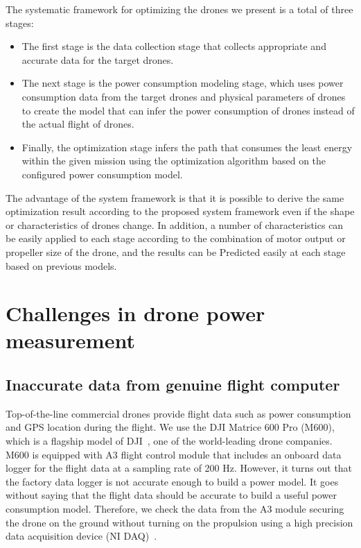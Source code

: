 \documentclass[journal]{./template/IEEEtran}
\begin{document}
The systematic framework for optimizing the drones we present is a total of three stages: 
\begin{itemize}
    \item The first stage is the data collection stage that collects appropriate and accurate data for the target drones.
    \item The next stage is the power consumption modeling stage, which uses power consumption data from the target drones and physical parameters of drones to create the model that can infer the power consumption of drones instead of the actual flight of drones.
    \item Finally, the optimization stage infers the path that consumes the least energy within the given mission using the optimization algorithm based on the configured power consumption model.
\end{itemize}

The advantage of the system framework is that it is possible to derive the same optimization result according to the proposed system framework even if the shape or characteristics of drones change.
In addition, a number of characteristics can be easily applied to each stage according to the combination of motor output or propeller size of the drone, and the results can be Predicted easily at each stage based on previous models.

\section{Challenges in drone power measurement}
\label{Section: Challenges in drone power measurement}
\subsection{Inaccurate data from genuine flight computer}
Top-of-the-line commercial drones provide flight data such as power consumption and GPS location during the flight. 
We use the DJI Matrice 600 Pro (M600), which is a flagship model of DJI~\cite{ref_11}, one of the world-leading drone companies. 
M600 is equipped with A3 flight control module that includes an onboard data logger for the flight data at a sampling rate of 200 Hz. However, it turns out that the factory data logger is not accurate enough to build a power model. It goes without saying that the flight data should be accurate to build a useful power consumption model.
Therefore, we check the data from the A3 module securing the drone on the ground without turning on the propulsion using a high precision data acquisition device (NI DAQ)~\cite{ref_12}.
\end{document}

